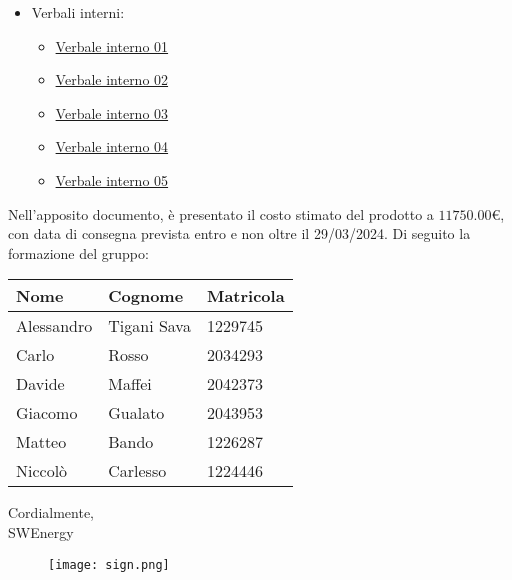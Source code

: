 \begin{itemize}
	\item Verbali interni:
	      \begin{itemize}
		      \item
		            \href{https://github.com/Project-SWEnergy/documentazione/blob/main/Candidatura/Verbali/Interni/Verbale%20interno%20-%2001.pdf}{Verbale interno 01}
		      \item
		            \href{https://github.com/Project-SWEnergy/documentazione/blob/main/Candidatura/Verbali/Interni/Verbale%20interno%20-%2002.pdf}{Verbale interno 02}
		      \item
		            \href{https://github.com/Project-SWEnergy/documentazione/blob/main/Candidatura/Verbali/Interni/Verbale%20interno%20-%2003.pdf}{Verbale interno 03}
		      \item
		            \href{https://github.com/Project-SWEnergy/documentazione/blob/main/Candidatura/Verbali/Interni/Verbale%20interno%20-%2004.pdf}{Verbale interno 04}
		      \item
		            \href{https://github.com/Project-SWEnergy/documentazione/blob/main/Candidatura/Verbali/Interni/Verbale%20interno%20-%2005.pdf}{Verbale interno 05}
	      \end{itemize}
\end{itemize}


\noindent
Nell'apposito documento, è presentato il costo stimato del prodotto a
$11750.00$\euro,
con data di consegna prevista entro e non oltre il 29/03/2024. Di seguito la
formazione del gruppo:
\begin{center}
	{
		\renewcommand{\arraystretch}{1.5}
		\begin{tabular}{lll}
			\textbf{Nome} & \textbf{Cognome} & \textbf{Matricola} \\
			\hline
			Alessandro    & Tigani Sava      & 1229745            \\
			Carlo         & Rosso            & 2034293            \\
			Davide        & Maffei           & 2042373            \\
			Giacomo       & Gualato          & 2043953            \\
			Matteo        & Bando            & 1226287            \\
			Niccolò       & Carlesso         & 1224446            \\
			\hline
		\end{tabular}
	}
\end{center}

\vspace{1cm}

\noindent
Cordialmente, \\
SWEnergy

\begin{figure}[H]
	\texttt{[image: sign.png]}
\end{figure}
